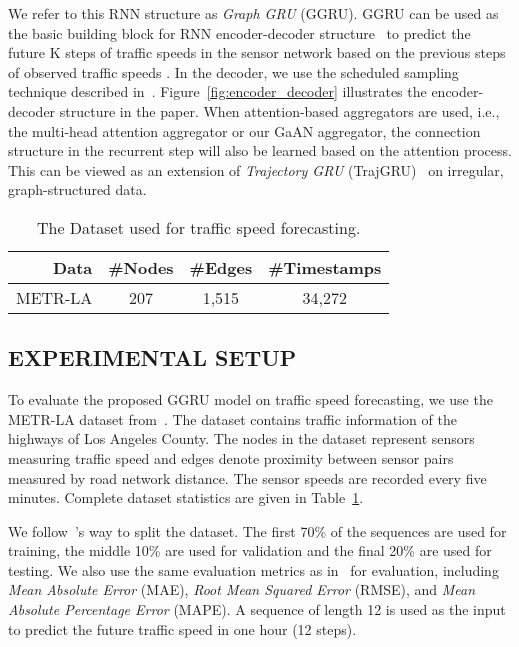 \documentclass{article}
\begin{document}
	We refer to this RNN structure as \emph{Graph GRU} (GGRU). GGRU can be used as the basic building block for RNN encoder-decoder structure~\citep{lin2017structured} to predict the future K steps of traffic speeds in the sensor network  based on the previous  steps of observed traffic speeds . In the decoder, we use the scheduled sampling
technique described in~\citep{lin2017structured}. Figure~\ref{fig:encoder_decoder} illustrates the encoder-decoder structure in the paper.
	When attention-based aggregators are used, i.e., the multi-head attention aggregator or our GaAN aggregator, the connection structure in the recurrent step will also be learned based on the attention process. This can be viewed as an extension of \emph{Trajectory GRU} (TrajGRU)~\citep{shi2017deep} on irregular, graph-structured data.
	\begin{table}[!tb]
		\centering
		\caption{The Dataset used for traffic speed forecasting.}
\begin{tabular}{r ccc}
			\hline
			\textbf{Data}  & \#\textbf{Nodes} & \#\textbf{Edges}  & \#\textbf{Timestamps} \\
			\hline \hline
			METR-LA   & 207    & 1,515  & 34,272 \\\hline
\end{tabular}
		\label{table:st_dataset}
\end{table}
	
	\subsection{EXPERIMENTAL SETUP}
To evaluate the proposed GGRU model on traffic speed forecasting, we use the METR-LA dataset from~\citep{li2017graph}. The dataset contains traffic information of the highways of Los Angeles County. The nodes in the dataset represent sensors measuring traffic speed and edges denote proximity between sensor pairs measured by road network distance. The sensor speeds are recorded every five minutes. Complete dataset statistics are given in Table~\ref{table:st_dataset}.
	
	We follow~\citep{li2017graph}'s way to split the dataset. The first 70\% of the sequences are used for training, the middle 10\% are used for validation and the final 20\% are used for testing. We also use the same evaluation metrics as in~\citep{li2017graph} for evaluation, including \emph{Mean Absolute Error} (MAE), \emph{Root Mean Squared Error} (RMSE), and \emph{Mean Absolute Percentage Error} (MAPE). A sequence of length 12 is used as the input to predict the future traffic speed in one hour (12 steps).
	
\end{document}
